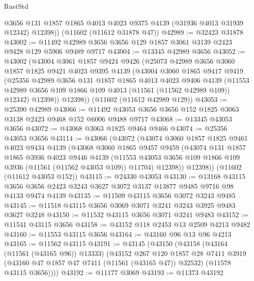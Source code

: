 \begin{lexlean}{RustStd}
\begin{coremodule}
        @3656
        @131
        @1857
        @1865
        @4013
        @4023
        @9375
        @4139
        (@31936 @4013 @31939 @12342)
        @12398))
    (@11602 (@11612 @31878 @47))
@42989 := @32423 @31878
@43002 := @11492 @42989 @3656 @3656 @129 @1857 @3061 @3139 @2423 @9428 @129 @5906 @9489 @9717
@43004 := @13345 @42989 @3656
@43052 := @43002
    (@43004
      @3061
      @1857
      @9424
      @9426
      (@25073
        @42989
        @3656
        @3060
        @1857
        @1825
        @9421
        @4023
        @9395
        @4139
        (@43004
          @3060
          @1865
          @9417
          @9419
          (@25356
            @42989
            @3656
            @131
            @1857
            @1865
            @4013
            @4023
            @9406
            @4139
            (@11553 @42989 @3656 @109 @1866 @109 @4013 (@11561 (@11562 @42989 @109)) @12342)
            @12398))
        @12398))
    (@11602 (@11612 @42989 @129))
@43053 := @25390 @42989
@43066 := @11492 @43053 @3656 @3656 @152 @1825 @3063 @3138 @2423 @9468 @152 @6006 @9488 @9717
@43068 := @13345 @43053 @3656
@43072 := @43068 @3063 @1825 @9464 @9466
@43074 := @25356 @43053 @3656
@43114 := @43066
    (@43072
      (@43074
        @3060
        @1857
        @1825
        @9461
        @4023
        @9434
        @4139
        (@43068
          @3060
          @1865
          @9457
          @9459
          (@43074
            @131
            @1857
            @1865
            @3936
            @4023
            @9446
            @4139
            (@11553 @43053 @3656 @109 @1866 @109 @3936 (@11561 (@11562 @43053 @109)) @11704)
            @12398))
        @12398))
    (@11602 (@11612 @43053 @152))
@43115 := @24330 @43053
@43130 := @13168
    @43115
    @3656
    @3656
    @2423
    @3243
    @3627
    @3072
    @3137
    @13877
    @9485
    @9716
    @98
    @4133
    @9474
    @4139
@43135 := @11509 @43115 @3656 @3072 @3243 @9485
@43145 := @11518 @43115 @3656 @3069 @3071 @3241 @3243 @3925 @9483 @3627 @3248
@43150 := @11532 @43115 @3656 @3071 @3241 @9483
@43152 := @11541 @43115 @3656
@43158 := @43152 @118 @2453 @13 @2509 @4213 @9482
@43160 := @11553 @43115 @3656
@43164 := @43160 @96 @13 @96 @4213
@43165 := @11562 @43115
@43191 := @43145
    (@43150
      (@43158
        (@43164 (@11561 (@43165 @96)) @13333)
        (@43152
          @267
          @120
          @1857
          @28
          @7411
          @3919
          (@43160 @47 @1857 @47 @7411 (@11561 (@43165 @47)) @32532)
          (@11578 @43115 @3656))))
@43192 := @11177 @3069
@43193 := @11373 @43192

\end{coremodule}
\end{lexlean}
